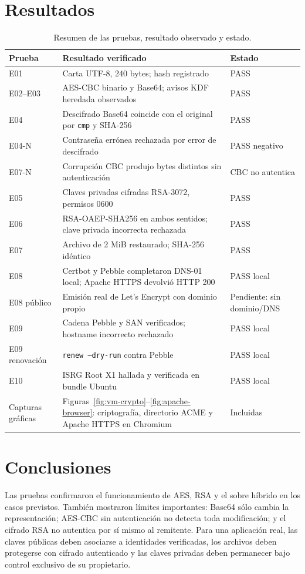 \documentclass[11pt,a4paper]{article}
\begin{document}
\section{Resultados}
\begin{table}[H]
\centering
\small
\begin{tabular}{|p{2.3cm}|p{8.2cm}|p{3.3cm}|}
\hline
\textbf{Prueba} & \textbf{Resultado verificado} & \textbf{Estado} \\
\hline
E01 & Carta UTF-8, 240 bytes; hash registrado & PASS \\
\hline
E02--E03 & AES-CBC binario y Base64; avisos KDF heredada observados & PASS \\
\hline
E04 & Descifrado Base64 coincide con el original por \texttt{cmp} y SHA-256 & PASS \\
\hline
E04-N & Contraseña errónea rechazada por error de descifrado & PASS negativo \\
\hline
E07-N & Corrupción CBC produjo bytes distintos sin autenticación & CBC no autentica \\
\hline
E05 & Claves privadas cifradas RSA-3072, permisos 0600 & PASS \\
\hline
E06 & RSA-OAEP-SHA256 en ambos sentidos; clave privada incorrecta rechazada & PASS \\
\hline
E07 & Archivo de 2 MiB restaurado; SHA-256 idéntico & PASS \\
\hline
E08 & Certbot y Pebble completaron DNS-01 local; Apache HTTPS devolvió HTTP 200 & PASS local \\
\hline
E08 público & Emisión real de Let's Encrypt con dominio propio & Pendiente: sin dominio/DNS \\
\hline
E09 & Cadena Pebble y SAN verificados; hostname incorrecto rechazado & PASS local \\
\hline
E09 renovación & \texttt{renew --dry-run} contra Pebble & PASS local \\
\hline
E10 & ISRG Root X1 hallada y verificada en bundle Ubuntu & PASS local \\
\hline
Capturas gráficas & Figuras~\ref{fig:vm-crypto}--\ref{fig:apache-browser}: criptografía, directorio ACME y Apache HTTPS en Chromium & Incluidas \\
\hline
\end{tabular}
\caption{Resumen de las pruebas, resultado observado y estado.}
\end{table}

\section{Conclusiones}
Las pruebas confirmaron el funcionamiento de AES, RSA y el sobre híbrido en
los casos previstos. También mostraron límites importantes: Base64 sólo cambia
la representación; AES-CBC sin autenticación no detecta toda modificación; y
el cifrado RSA no autentica por sí mismo al remitente. Para una aplicación
real, las claves públicas deben asociarse a identidades verificadas, los
archivos deben protegerse con cifrado autenticado y las claves privadas deben
permanecer bajo control exclusivo de su propietario.
\end{document}
